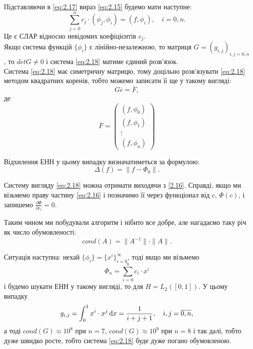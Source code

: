 Підставляючи в \eqref{eq:2.17} вираз \eqref{eq:2.15} будемо мати наступне:
\begin{equation}
	\label{eq:2.18}
	\sum_{j = 0}^n c_j \cdot (\phi_j, \phi_i) = (f, \phi_i), \quad i = \overline{0, n}.
\end{equation}
Це є СЛАР відносно невідомих коефіцієнтів $c_j$. \\

Якщо система функцій $\{\phi_i\}$ є лінійно-незалежною, то матриця $G = (g_{i, j})_{i, j = \overline{0, n}}$, то $det G \ne 0$ і система \eqref{eq:2.18} матиме єдиний розв'язок. \\

Система \eqref{eq:2.18} має симетричну матрицю, тому доцільно розв'язувати \eqref{eq:2.18} методом квадратних коренів, тобто можемо записати її ще у такому вигляді:
\begin{equation}
	\label{eq:2.18_prime}
	G \overline{c} = \overline{F},
\end{equation}
де
\begin{equation*}
	\overline{F} = \begin{pmatrix} (f, \phi_0) \\ (f, \phi_1) \\ \vdots \\ (f, \phi_n) \end{pmatrix}	
\end{equation*}

Відхилення ЕНН у цьому випадку визначатиметься за формулою:
\begin{equation}
	\label{eq:2.19}
	\Delta(f) = \| f - \Phi_0\|.	
\end{equation}

\begin{remark*}
	Систему вигляду \eqref{eq:2.18} можна отримати виходячи з \eqref{2.16}. Справді, якщо ми візьмемо праву частину \eqref{eq:2.16} і позначимо її через функціонал від $c$, $\Phi(c)$, і запишемо $\frac{\partial \Phi}{\partial c_i} = 0$.
\end{remark*}

Таким чином ми побудували алгоритм і нібито все добре, але нагадаємо таку річ як число обумовленості:
\begin{equation*}
	cond(A) = \|A^{-1}\| \cdot \|A\|.
\end{equation*}

Ситуація наступна: нехай $\{\phi_i\} = \{x^i\}_{i = 0}^\infty$, тоді якщо ми візьмемо
\begin{equation*}
	\Phi_n = \sum_{i = 0}^n c_i \cdot x^i
\end{equation*}
і будемо шукати ЕНН у такому вигляді, то для $H = L_2([0, 1])$. У цьому випадку 
\begin{equation*}
	g_{i, j} = \int_0^1 x^i \cdot x^j \mathop{}\!\mathrm{d} x = \frac{1}{i + j + 1}, \quad i, j = \overline{0, n},
\end{equation*}
а тоді $cond(G) \approx 10^8$ при $n = 7$, $cond(G) \approx 10^9$ при $n = 8$ і так далі, тобто дуже швидко росте, тобто система \eqref{eq:2.18} буде дуже погано обумовленою.

